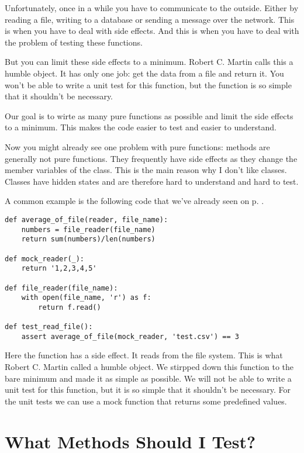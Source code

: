 Unfortunately, once in a while you have to communicate to the outside. Either by reading a file, writing to a database or sending a message over the network. This is when you have to deal with side effects. And this is when you have to deal with the problem of testing these functions.

But you can limit these side effects to a minimum. Robert C. Martin calls this a humble object. It has only one job: get the data from a file and return it. You won't be able to write a unit test for this function, but the function is so simple that it shouldn't be necessary.

Our goal is to wirte as many pure functions as possible and limit the side effects to a minimum. This makes the code easier to test and easier to understand.

Now you might already see one problem with pure functions: methods are generally not pure functions. They frequently have side effects as they change the member variables of the class. This is the main reason why I don't like classes. Classes have hidden states and are therefore hard to understand and hard to test.

A common example is the following code that we've already seen on p. \pageref{prog:average_of_file}.

\begin{programcode}{}\label{prog:mock_reader}
\begin{verbatim}
def average_of_file(reader, file_name):
    numbers = file_reader(file_name)
    return sum(numbers)/len(numbers)

def mock_reader(_):
    return '1,2,3,4,5'

def file_reader(file_name):
    with open(file_name, 'r') as f:
        return f.read()

def test_read_file():
    assert average_of_file(mock_reader, 'test.csv') == 3
\end{verbatim}
\end{programcode}

Here the function  has a side effect. It reads from the file system. This is what Robert C. Martin called a humble object. We stirpped down this function to the bare minimum and made it as simple as possible. We will not be able to write a unit test for this function, but it is so simple that it shouldn't be necessary. For the unit tests we can use a mock function that returns some predefined values.


\section{What Methods Should I Test?}

